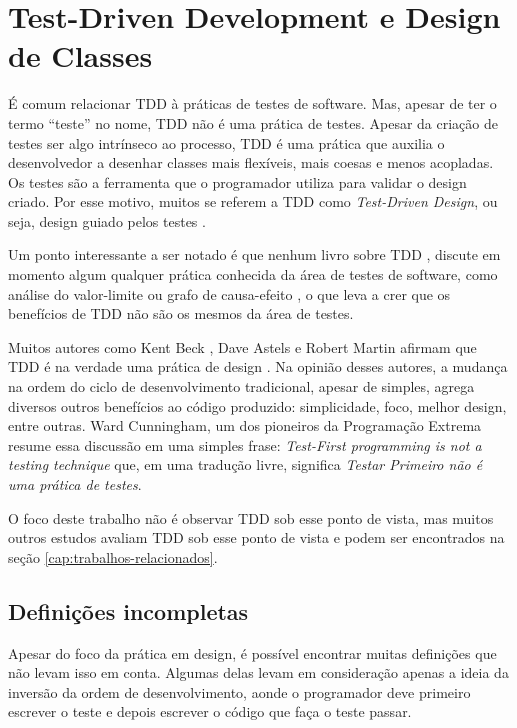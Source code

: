 \chapter{Test-Driven Development e Design de Classes}
\label{cap:tdd-e-design}

É comum relacionar TDD à práticas de testes de software. Mas, apesar de ter o
termo ``teste'' no nome, TDD não é uma prática de testes.
Apesar da criação de testes ser algo intrínseco ao processo, TDD é uma prática
que auxilia o desenvolvedor a desenhar classes mais flexíveis, mais coesas e
menos acopladas. Os testes são a ferramenta que o programador utiliza para
validar o design criado. Por esse motivo, muitos se referem a TDD como
\textit{Test-Driven Design}, ou seja, design guiado pelos testes
\cite{tdd-taxonomy}.

Um ponto interessante a ser notado é que nenhum livro sobre TDD \cite{GOOS}
\cite{TDDByExample} \cite{astels-tdd}, discute em momento algum qualquer
prática conhecida da área de testes de software, como análise do valor-limite ou
grafo de causa-efeito \cite{art-of-sw-testing}, o que leva a crer que os
benefícios de TDD não são os mesmos da área de testes.

Muitos autores como Kent Beck \cite{aim-fire}, Dave Astels \cite{astels-tdd} e
Robert Martin \cite{bob-martin} afirmam que TDD é na verdade uma prática de
design \cite{tdd-taxonomy} \cite{aim-fire}.
Na opinião desses autores, a mudança na ordem do ciclo de
desenvolvimento tradicional, apesar de simples, agrega diversos outros
benefícios ao código produzido: simplicidade, foco, melhor design, entre outras.
Ward Cunningham, um dos pioneiros da Programação Extrema resume essa discussão
em uma simples frase: \textit{Test-First programming is not a testing technique}
que, em uma tradução livre, significa \textit{Testar Primeiro não é uma prática 
de testes}.

O foco deste trabalho não é observar TDD sob esse ponto de vista, mas muitos
outros estudos avaliam TDD sob esse ponto de vista e podem ser encontrados na
seção \ref{cap:trabalhos-relacionados}.

\section{Definições incompletas}

Apesar do foco da prática em design, é possível encontrar muitas definições que
não levam isso em conta. Algumas delas levam em consideração apenas a ideia da
inversão da ordem de desenvolvimento, aonde o programador deve primeiro escrever
o teste e depois escrever o código que faça o teste passar.

